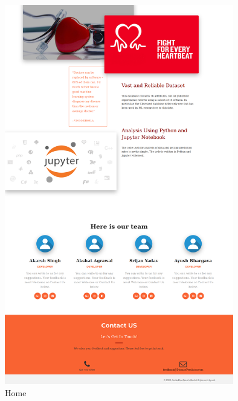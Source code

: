 \documentclass[oneside,12pt]{Classes/VTU}
\begin{document}
    		\begin{figure}
    				\begin{center}
    				\includegraphics[width=10cm,scale=0.5]{Screenshots/home3.PNG}
    				\caption{Home}
    				\end{center}
    		\end{figure}
    
\end{document}
